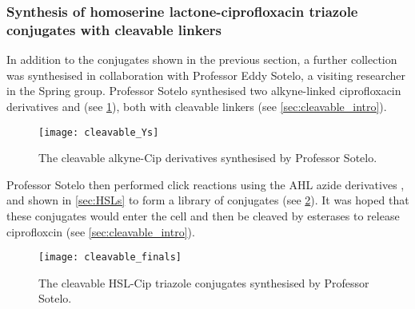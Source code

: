 \subsubsection{Synthesis of homoserine lactone-ciprofloxacin triazole conjugates with cleavable linkers\label{sec:cleavable}}

%
%

In addition to the conjugates shown in the previous section, a further collection was synthesised in collaboration with Professor Eddy Sotelo, a visiting researcher in the Spring group. Professor Sotelo synthesised two alkyne-linked ciprofloxacin derivatives  and  (see \ref{fig:cleavable_Ys}), both with cleavable linkers (see \ref{sec:cleavable_intro}). 

\begin{figure}[H]
	\begin{center}
		\texttt{[image: cleavable\_Ys]}
		\caption{
			The cleavable alkyne-Cip derivatives synthesised by Professor Sotelo.
			\label{fig:cleavable_Ys}}
	\end{center}
\end{figure}

Professor Sotelo then performed click reactions using the AHL azide derivatives ,  and  shown in \ref{sec:HSLs} to form a library of conjugates (see \ref{fig:cleavable_finals}). It was hoped that these conjugates would enter the cell and then be cleaved by esterases to release ciprofloxcin (see \ref{sec:cleavable_intro}).

\begin{figure}[H]
	\begin{center}
		\texttt{[image: cleavable\_finals]}
		\caption{
			The cleavable HSL-Cip triazole conjugates synthesised by Professor Sotelo.
			\label{fig:cleavable_finals}}
	\end{center}
\end{figure}

